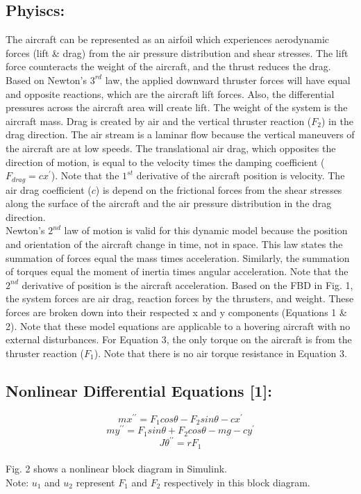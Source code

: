 \documentclass[conference]{IEEEtran}
\begin{document}
\subsection{Phyiscs:}
The aircraft can be represented as an airfoil which experiences aerodynamic forces (lift \& drag) from the air pressure distribution and shear stresses. The lift force counteracts the weight of the aircraft, and the thrust reduces the drag. Based on Newton’s $3^{rd}$ law, the applied downward thruster forces will have equal and opposite reactions, which are the aircraft lift forces. Also, the differential pressures across the aircraft area will create lift. The weight of the system is the aircraft mass. Drag is created by air and the vertical thruster reaction ($F_2$) in the drag direction. The air stream is a laminar flow because the vertical maneuvers of the aircraft are at low speeds. The translational air drag, which opposites the direction of motion, is equal to the velocity times the damping coefficient ($F_{drag} = cx^\prime$). Note that the $1^{st}$ derivative of the aircraft position is velocity. The air drag coefficient ($c$) is depend on the frictional forces from the shear stresses along the surface of the aircraft and the air pressure distribution in the drag direction.\\

Newton's $2^{nd}$ law of motion is valid for this dynamic model because the position and orientation of the aircraft change in time, not in space. This law states the summation of forces equal the mass times acceleration. Similarly, the summation of torques equal the moment of inertia times angular acceleration. Note that the $2^{nd}$ derivative of position is the aircraft acceleration. Based on the FBD in Fig. 1, the system forces are air drag, reaction forces by the thrusters, and weight. These forces are broken down into their respected x and y components (Equations 1 \& 2). Note that these model equations are applicable to a hovering aircraft with no external disturbances. For Equation 3, the only torque on the aircraft is from the thruster reaction ($F_1$). Note that there is no air torque resistance in Equation 3.

\subsection{Nonlinear Differential Equations [1]:} 
\[
mx^{\prime\prime} = F_1cos\theta - F_2sin\theta - cx^{\prime}  \tag{1}
\] 
\[
my^{\prime\prime} = F_1sin \theta + F_2cos\theta - mg - cy^\prime \tag{2}
\]
\[
J\theta^{\prime\prime} = rF_1 \tag{3} 
\]\\
Fig. 2 shows a nonlinear block diagram in Simulink. \\
Note: $u_1$ and $u_2$ represent $F_1$ and $F_2$ respectively in this block diagram. \\
\end{document}
